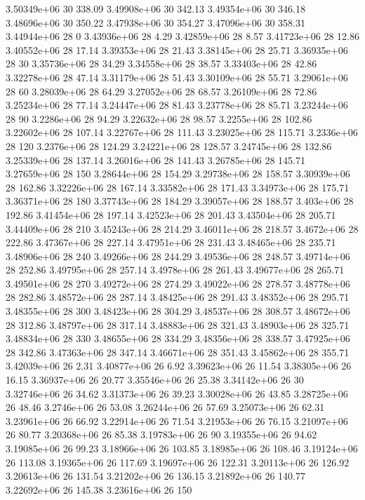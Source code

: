 3.50349e+06 30 338.09
3.49908e+06 30 342.13
3.49354e+06 30 346.18
3.48696e+06 30 350.22
3.47938e+06 30 354.27
3.47096e+06 30 358.31
3.44944e+06 28 0
3.43936e+06 28 4.29
3.42859e+06 28 8.57
3.41723e+06 28 12.86
3.40552e+06 28 17.14
3.39353e+06 28 21.43
3.38145e+06 28 25.71
3.36935e+06 28 30
3.35736e+06 28 34.29
3.34558e+06 28 38.57
3.33403e+06 28 42.86
3.32278e+06 28 47.14
3.31179e+06 28 51.43
3.30109e+06 28 55.71
3.29061e+06 28 60
3.28039e+06 28 64.29
3.27052e+06 28 68.57
3.26109e+06 28 72.86
3.25234e+06 28 77.14
3.24447e+06 28 81.43
3.23778e+06 28 85.71
3.23244e+06 28 90
3.2286e+06 28 94.29
3.22632e+06 28 98.57
3.2255e+06 28 102.86
3.22602e+06 28 107.14
3.22767e+06 28 111.43
3.23025e+06 28 115.71
3.2336e+06 28 120
3.2376e+06 28 124.29
3.24221e+06 28 128.57
3.24745e+06 28 132.86
3.25339e+06 28 137.14
3.26016e+06 28 141.43
3.26785e+06 28 145.71
3.27659e+06 28 150
3.28644e+06 28 154.29
3.29738e+06 28 158.57
3.30939e+06 28 162.86
3.32226e+06 28 167.14
3.33582e+06 28 171.43
3.34973e+06 28 175.71
3.36371e+06 28 180
3.37743e+06 28 184.29
3.39057e+06 28 188.57
3.403e+06 28 192.86
3.41454e+06 28 197.14
3.42523e+06 28 201.43
3.43504e+06 28 205.71
3.44409e+06 28 210
3.45243e+06 28 214.29
3.46011e+06 28 218.57
3.4672e+06 28 222.86
3.47367e+06 28 227.14
3.47951e+06 28 231.43
3.48465e+06 28 235.71
3.48906e+06 28 240
3.49266e+06 28 244.29
3.49536e+06 28 248.57
3.49714e+06 28 252.86
3.49795e+06 28 257.14
3.4978e+06 28 261.43
3.49677e+06 28 265.71
3.49501e+06 28 270
3.49272e+06 28 274.29
3.49022e+06 28 278.57
3.48778e+06 28 282.86
3.48572e+06 28 287.14
3.48425e+06 28 291.43
3.48352e+06 28 295.71
3.48355e+06 28 300
3.48423e+06 28 304.29
3.48537e+06 28 308.57
3.48672e+06 28 312.86
3.48797e+06 28 317.14
3.48883e+06 28 321.43
3.48903e+06 28 325.71
3.48834e+06 28 330
3.48655e+06 28 334.29
3.48356e+06 28 338.57
3.47925e+06 28 342.86
3.47363e+06 28 347.14
3.46671e+06 28 351.43
3.45862e+06 28 355.71
3.42039e+06 26 2.31
3.40877e+06 26 6.92
3.39623e+06 26 11.54
3.38305e+06 26 16.15
3.36937e+06 26 20.77
3.35546e+06 26 25.38
3.34142e+06 26 30
3.32746e+06 26 34.62
3.31373e+06 26 39.23
3.30028e+06 26 43.85
3.28725e+06 26 48.46
3.2746e+06 26 53.08
3.26244e+06 26 57.69
3.25073e+06 26 62.31
3.23961e+06 26 66.92
3.22914e+06 26 71.54
3.21953e+06 26 76.15
3.21097e+06 26 80.77
3.20368e+06 26 85.38
3.19783e+06 26 90
3.19355e+06 26 94.62
3.19085e+06 26 99.23
3.18966e+06 26 103.85
3.18985e+06 26 108.46
3.19124e+06 26 113.08
3.19365e+06 26 117.69
3.19697e+06 26 122.31
3.20113e+06 26 126.92
3.20613e+06 26 131.54
3.21202e+06 26 136.15
3.21892e+06 26 140.77
3.22692e+06 26 145.38
3.23616e+06 26 150
